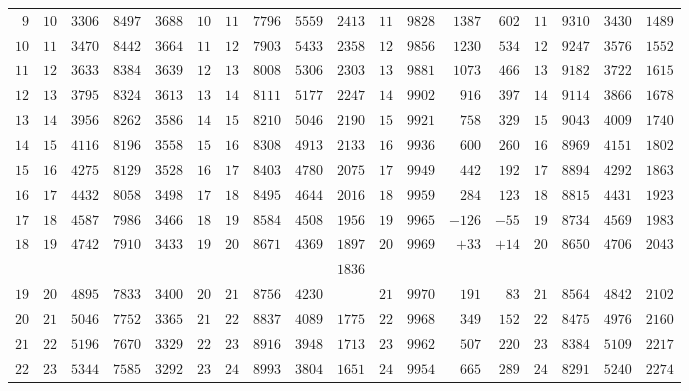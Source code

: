 \begin{center}
\begin{tabular}{rr|r|r|r||rr|r|r|r||r|r|r|r||r|r|r|r}
$9$ & $10$ & $3306$ & $8497$ & $3688$ & $10$ & $11$ & $7796$ & $5559$ & $2413$ & $11$ & $9828$ & $1387$ & $602$ & $11$ & $9310$ & $3430$ & $1489$\\
$10$ & $11$ & $3470$ & $8442$ & $3664$ & $11$ & $12$ & $7903$ & $5433$ & $2358$ & $12$ & $9856$ & $1230$ & $534$ & $12$ & $9247$ & $3576$ & $1552$\\
$11$ & $12$ & $3633$ & $8384$ & $3639$ & $12$ & $13$ & $8008$ & $5306$ & $2303$ & $13$ & $9881$ & $1073$ & $466$ & $13$ & $9182$ & $3722$ & $1615$\\
$12$ & $13$ & $3795$ & $8324$ & $3613$ & $13$ & $14$ & $8111$ & $5177$ & $2247$ & $14$ & $9902$ & $916$ & $397$ & $14$ & $9114$ & $3866$ & $1678$\\
$13$ & $14$ & $3956$ & $8262$ & $3586$ & $14$ & $15$ & $8210$ & $5046$ & $2190$ & $15$ & $9921$ & $758$ & $329$ & $15$ & $9043$ & $4009$ & $1740$\\[3pt]
$14$ & $15$ & $4116$ & $8196$ & $3558$ & $15$ & $16$ & $8308$ & $4913$ & $2133$ & $16$ & $9936$ & $600$ & $260$ & $16$ & $8969$ & $4151$ & $1802$\\
$15$ & $16$ & $4275$ & $8129$ & $3528$ & $16$ & $17$ & $8403$ & $4780$ & $2075$ & $17$ & $9949$ & $442$ & $192$ & $17$ & $8894$ & $4292$ & $1863$\\
$16$ & $17$ & $4432$ & $8058$ & $3498$ & $17$ & $18$ & $8495$ & $4644$ & $2016$ & $18$ & $9959$ & $284$ & $123$ & $18$ & $8815$ & $4431$ & $1923$\\
$17$ & $18$ & $4587$ & $7986$ & $3466$ & $18$ & $19$ & $8584$ & $4508$ & $1956$ & $19$ & $9965$ & $-126$ & $-55$ & $19$ & $8734$ & $4569$ & $1983$\\
$18$ & $19$ & $4742$ & $7910$ & $3433$ & $19$ & $20$ & $8671$ & $4369$ & $1897$ & $20$ & $9969$ & $+33$ & $+14$ & $20$ & $8650$ & $4706$ & $2043$\\
 &  &  &  &  &  &  &  &  & $1836$ &  &  &  &  &  &  &  & \\
$19$ & $20$ & $4895$ & $7833$ & $3400$ & $20$ & $21$ & $8756$ & $4230$ &  & $21$ & $9970$ & $191$ & $83$ & $21$ & $8564$ & $4842$ & $2102$\\
$20$ & $21$ & $5046$ & $7752$ & $3365$ & $21$ & $22$ & $8837$ & $4089$ & $1775$ & $22$ & $9968$ & $349$ & $152$ & $22$ & $8475$ & $4976$ & $2160$\\
$21$ & $22$ & $5196$ & $7670$ & $3329$ & $22$ & $23$ & $8916$ & $3948$ & $1713$ & $23$ & $9962$ & $507$ & $220$ & $23$ & $8384$ & $5109$ & $2217$\\
$22$ & $23$ & $5344$ & $7585$ & $3292$ & $23$ & $24$ & $8993$ & $3804$ & $1651$ & $24$ & $9954$ & $665$ & $289$ & $24$ & $8291$ & $5240$ & $2274$\\

\end{tabular}
\end{center}
